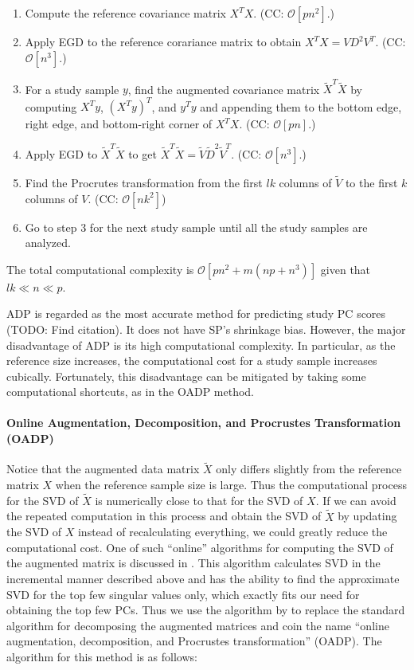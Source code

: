 \documentclass{article}
\newcommand{\bO}{\mathcal{O}}
\newcommand{\todo}[1]{{\color{red} (TODO: #1)}}
\begin{document}
\begin{enumerate}
\item Compute the reference covariance matrix $X^T X$.
  (CC: $\bO[pn^2]$.)  
\item Apply EGD to the reference corariance matrix
  to obtain $X^T X = V D^2 V^T$.
  (CC: $\bO[n^3]$.)
\item For a study sample $y$,
  find the augmented covariance matrix
  $\tilde{X}^T \tilde{X}$
  by computing $X^T y$, $(X^T y)^T$, and $y^T y$
  and appending them to the
  bottom edge,
  right edge,
  and bottom-right corner of $X^TX$.
  (CC: $\bO[pn]$.)
\item Apply EGD to $\tilde{X}^T \tilde{X}$ to get $\tilde{X}^T \tilde{X} = \tilde{V} \tilde{D}^2 \tilde{V}^T$.
  (CC: $\bO[n^3]$.)
\item Find the Procrutes transformation
from the first $lk$ columns of $\tilde{V}$
to the first $k$ columns of $V$.
  (CC: $\bO[nk^2]$)
  \item Go to step 3 for the next study sample
  until all the study samples are analyzed.
\end{enumerate}
The total computational complexity is
$\bO[pn^2 + m(np + n^3)]$
given that $lk \ll n \ll p$.

ADP is regarded as the most accurate method for predicting study PC scores \todo{Find citation}.
It does not have SP's shrinkage bias.
However, the major disadvantage of ADP
is its high computational complexity.
In particular,
as the reference size increases,
the computational cost for a study sample
increases cubically.
Fortunately, this disadvantage can be mitigated by taking some computational shortcuts,
as in the OADP method.

\paragraph{Online Augmentation, Decomposition, and Procrustes Transformation (OADP)}

Notice that the augmented data matrix $\tilde{X}$
only differs slightly from the reference matrix $X$
when the reference sample size is large.
Thus the computational process for the SVD of $\tilde{X}$
is numerically close to that for the SVD of $X$.
If we can avoid the repeated computation in this process
and obtain the SVD of $\tilde{X}$
by updating the SVD of $X$
instead of recalculating everything,
we could greatly reduce the computational cost.
One of such ``online'' algorithms for computing the SVD of the augmented matrix is discussed in \citet{brand2002incremental}.
This algorithm calculates SVD in the incremental manner described above
and has the ability to find the approximate SVD for the top few singular values only,
which exactly fits our need for obtaining the top few PCs.
Thus we use the algorithm by \citet{brand2002incremental}
to replace the standard algorithm for decomposing the augmented matrices
and coin the name ``online augmentation, decomposition, and Procrustes transformation'' (OADP).
The algorithm for this method is as follows:
\end{document}
